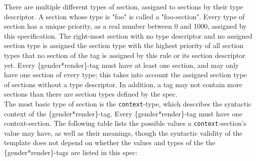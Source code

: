\documentclass{article}
\begin{document}
    There are multiple different types of section, assigned to sections by their type descriptor.
    A section whose type is "foo" is called a "foo-section".
    Every type of section has a unique priority, as a real number between 0 and 1000, assigned by this specification.
    The right-most section with no type descriptor and no assigned section type is assigned the section type with the highest priority of all section types that no section of the tag is assigned by this rule or its section descriptor yet.
    Every \{gender*render\}-tag must have at least one section, and may only have one section of every type;
    this takes into account the assigned section type of sections without a type descriptor.
    In addition, a tag may not contain more sections than there are section types defined by the spec.\\

    The most basic type of section is the \texttt{context}-type, which describes the syntactic context of the \{gender*render\}-tag.
    Every \{gender*render\}-tag must have one context-section.
    The following table lists the possible values a \texttt{context}-section's value may have, as well as their meanings, though the syntactic validity of the template does not depend on whether the values and types of the the \{gender*render\}-tags are listed in this spec:
\end{document}

